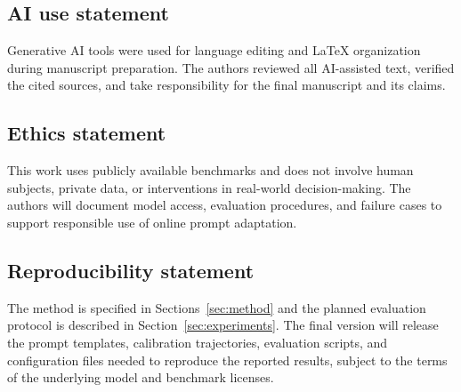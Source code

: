 \documentclass{article} %
\author{Anonymous Authors}
\begin{document}
\maketitle

\begin{abstract}

\end{abstract}







\subsection*{AI use statement}

Generative AI tools were used for language editing and LaTeX organization during manuscript preparation. The authors reviewed all AI-assisted text, verified the cited sources, and take responsibility for the final manuscript and its claims.

\subsection*{Ethics statement}

This work uses publicly available benchmarks and does not involve human subjects, private data, or interventions in real-world decision-making. The authors will document model access, evaluation procedures, and failure cases to support responsible use of online prompt adaptation.

\subsection*{Reproducibility statement}

The method is specified in Sections~\ref{sec:method} and the planned evaluation protocol is described in Section~\ref{sec:experiments}. The final version will release the prompt templates, calibration trajectories, evaluation scripts, and configuration files needed to reproduce the reported results, subject to the terms of the underlying model and benchmark licenses.




\appendix

\end{document}
